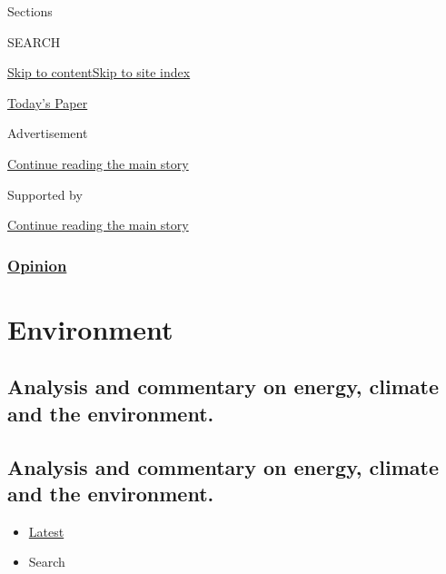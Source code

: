Sections

SEARCH

\protect\hyperlink{site-content}{Skip to
content}\protect\hyperlink{site-index}{Skip to site index}

\href{https://myaccount.nytimes3xbfgragh.onion/auth/login?response_type=cookie\&client_id=vi}{}

\href{https://www.nytimes3xbfgragh.onion/section/todayspaper}{Today's
Paper}

Advertisement

\protect\hyperlink{after-top}{Continue reading the main story}

Supported by

\protect\hyperlink{after-sponsor}{Continue reading the main story}

\hypertarget{opinion}{%
\subsubsection{\texorpdfstring{\href{/section/opinion}{Opinion}}{Opinion}}\label{opinion}}

\hypertarget{environment}{%
\section{Environment}\label{environment}}

\hypertarget{analysis-and-commentary-on-energy-climate-and-the-environment}{%
\subsection{Analysis and commentary on energy, climate and the
environment.}\label{analysis-and-commentary-on-energy-climate-and-the-environment}}

\hypertarget{analysis-and-commentary-on-energy-climate-and-the-environment-1}{%
\subsection{Analysis and commentary on energy, climate and the
environment.}\label{analysis-and-commentary-on-energy-climate-and-the-environment-1}}

\begin{itemize}
\tightlist
\item
  \protect\hyperlink{stream-panel}{Latest}
\item
  Search
\end{itemize}

